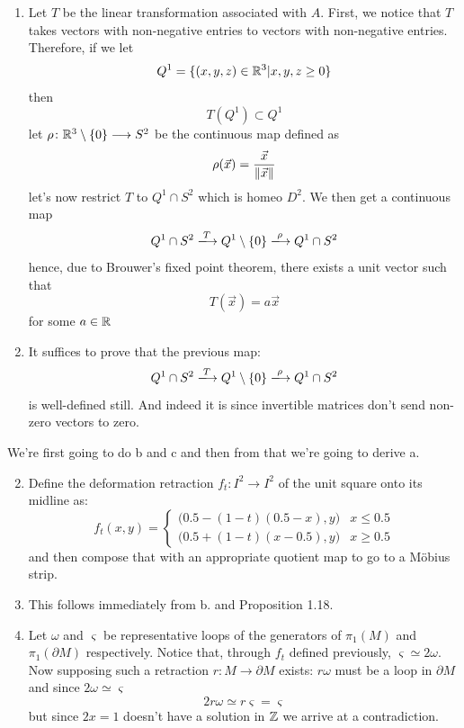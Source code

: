 \documentclass{pset}
\begin{document}
\begin{problem}
    \begin{enumerate}
        \item Let $T$ be the linear transformation associated with $A$. First, we notice that $T$ takes vectors with non-negative entries to vectors with non-negative entries. Therefore, if we let
        \[Q^1 = \{(x, y, z)\in\mathbb{R}^3|x,y,z\geq 0\}\]
        then
        \[T(Q^1) \subset Q^1\]
        let $\rho\colon \mathbb{R}^3\setminus \{0\}\longrightarrow S^2$ be the continuous map defined as
        \[\rho(\vec{x}) = \frac{\vec{x}}{\norm{\vec{x}}}\]
        let's now restrict $T$ to $Q^1 \cap S^2$ which is homeo $D^2$. We then get a continuous map
        \[Q^1 \cap S^2 \xlongrightarrow{T} Q^1 \setminus \{0\} \xlongrightarrow{\rho} Q^1 \cap S^2\]
        hence, due to Brouwer's fixed point theorem, there exists a unit vector such that
        \[T(\vec{x}) = a\vec{x}\]
        for some $a\in\mathbb{R}$
        
        \item It suffices to prove that the previous map:
        \[Q^1 \cap S^2 \xlongrightarrow{T} Q^1 \setminus \{0\} \xlongrightarrow{\rho} Q^1 \cap S^2\]
        is well-defined still. And indeed it is since invertible matrices don't send non-zero vectors to zero.
    \end{enumerate}
\end{problem}
\begin{problem}
    We're first going to do b and c and then from that we're going to derive a.
    \begin{enumerate}
        \setcounter{enumi}{1}
        \item Define the deformation retraction $f_t:I^2 \to I^2$ of the unit square onto its midline as:
        \[f_t(x, y) = 
        \begin{cases}
            \big(0.5 - (1-t)(0.5-x), y\big) & x \leq 0.5 \\
            \big(0.5 + (1-t)(x-0.5), y\big) & x \geq 0.5 
        \end{cases}
        \]
        and then compose that with an appropriate quotient map to go to a Möbius strip.

        \item This follows immediately from b. and Proposition 1.18.
        \setcounter{enumi}{0}
        \item Let $\omega$ and $\varsigma$ be representative loops of the generators of $\pi_1(M)$ and $\pi_1(\partial M)$ respectively. Notice that, through $f_t$ defined previously, $\varsigma \simeq 2\omega$. Now supposing such a retraction $r\colon M\to\partial M$ exists: $r\omega$ must be a loop in $\partial M$ and since $2\omega \simeq \varsigma$ 
        \[2r\omega\simeq r\varsigma = \varsigma\]
        but since $2x=1$ doesn't have a solution in $\mathbb{Z}$ we arrive at a contradiction.
    \end{enumerate}
\end{problem}
\end{document}
